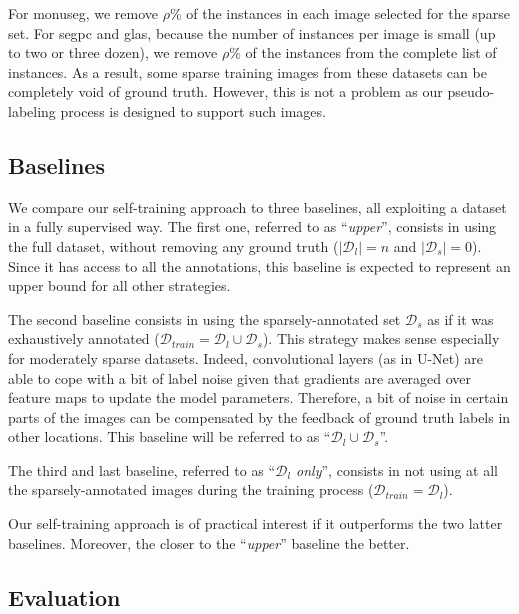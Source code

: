 For \acrshort{monuseg}, we remove $\rho \%$ of the instances in each image selected for the sparse set. For \acrshort{segpc} and \acrshort{glas}, because the number of instances per image is small (up to two or three dozen), we remove $\rho \%$ of the instances from the complete list of instances. As a result, some sparse training images from these  datasets can be completely void of ground truth. However, this is not a problem as our pseudo-labeling process is designed to support such images. 

\subsection{Baselines}
\label{ssec:strain:baselines}

We compare our self-training approach to three baselines, all exploiting a dataset in a fully supervised way. The first one, referred to as ``\textit{upper}'', consists in using the full dataset, without removing any ground truth (\ie $|\mathcal{D}_l| = n$ and $|\mathcal{D}_s| = 0$). Since it has access to all the annotations, this baseline is expected to represent an upper bound for all other strategies. 

The second baseline consists in using the sparsely-annotated set $\mathcal{D}_s$ as if it was exhaustively annotated ($\mathcal{D}_{train} = \mathcal{D}_l \cup \mathcal{D}_s$). This strategy makes sense especially for moderately sparse datasets. Indeed, convolutional layers (as in U-Net) are able to cope with a bit of label noise given that gradients are averaged over feature maps to update the model parameters. Therefore, a bit of noise in certain parts of the images can be compensated by the feedback of ground truth labels in other locations. This baseline will be referred to as ``$\mathcal{D}_l \cup \mathcal{D}_s$''.

The third and last baseline, referred to as ``\textit{$\mathcal{D}_l$ only}'', consists in not using at all the sparsely-annotated images during the training process (\ie $\mathcal{D}_{train} = \mathcal{D}_l$).

Our self-training approach is of practical interest if it outperforms the two latter baselines. Moreover, the closer to the ``\textit{upper}'' baseline the better.

\subsection{Evaluation}
\label{ssec:strain:evaluation}

